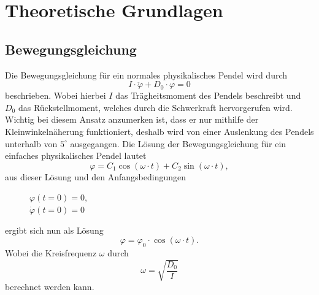 \section{Theoretische Grundlagen}

\subsection{Bewegungsgleichung}
Die Bewegungsgleichung für ein normales physikalisches Pendel wird durch
\begin{equation}
    I \cdot \ddot{\varphi} + D_0 \cdot \varphi = 0
    \label{eq:NB}
\end{equation}
beschrieben. Wobei hierbei $I$ das Trägheitsmoment des Pendels beschreibt und $D_0$ das Rückstellmoment, welches durch die Schwerkraft hervorgerufen wird. Wichtig bei diesem Ansatz anzumerken ist, dass er nur mithilfe der Kleinwinkelnäherung funktioniert, deshalb wird von einer Auslenkung des Pendels unterhalb von $5^\circ$ ausgegangen. Die Lösung der Bewegungsgleichung für ein einfaches physikalisches Pendel lautet
\begin{equation}
    \varphi = C_1 \cos\left(\omega \cdot t\right) + C_2 \sin\left(\omega \cdot t\right),
    \label{eq:Lsg1}
\end{equation}
aus dieser Lösung und den Anfangsbedingungen
\begin{figure}[H]
    \centering
    $ \varphi\left(t=0\right) = 0,$\\
    $ \dot{\varphi}\left(t=0\right) = 0 $
\end{figure}
ergibt sich nun als Lösung
\begin{equation}
    \varphi = \varphi_0 \cdot \cos\left(\omega \cdot t\right).
    \label{eq:Lsgphi}
\end{equation}
Wobei die Kreisfrequenz $\omega$ durch
\begin{equation}
    \omega = \sqrt{\frac{D_0}{I}}
    \label{omega}
\end{equation}
berechnet werden kann.

